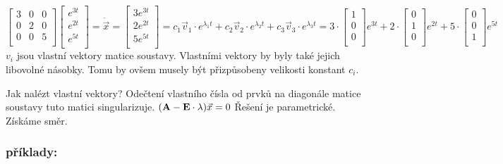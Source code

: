 \[
 \left[
    \begin{array}{ccc}
     3 & 0 & 0\\
     0 & 2 & 0\\
     0 & 0 & 5\\
    \end{array}
  \right]
  \left[
    \begin{array}{c}
     e^{3t}\\
     e^{2t}\\
     e^{5t}\\
    \end{array}
  \right] = 
  \dot{\vec{x}} = 
  \left[
    \begin{array}{c}
     3e^{3t}\\
     2e^{2t}\\
     5e^{5t}\\
    \end{array}
  \right] = 
  c_1\vec{v}_1\cdot e^{\lambda_1 t} + c_2\vec{v}_2\cdot e^{\lambda_2 t} + c_3\vec{v}_3\cdot e^{\lambda_3 t} = 
  3\cdot\left[
    \begin{array}{c}
     1\\
     0\\
     0\\
    \end{array}
  \right] e^{3t} +
  2\cdot\left[
    \begin{array}{c}
     0\\
     1\\
     0\\
    \end{array}
  \right] e^{2t} +
  5\cdot\left[
    \begin{array}{c}
     0\\
     0\\
     1\\
    \end{array}
  \right] e^{5t}
\]
$v_i$ jsou vlastní vektory matice soustavy. Vlastními vektory by byly také jejich libovolné násobky. Tomu by ovšem musely být přizpůsobeny velikosti konstant $c_i$.





Jak nalézt vlastní vektory?\newline
Odečtení vlastního čísla od prvků na diagonále matice soustavy tuto matici singularizuje. $({\bf A} - {\bf E}\cdot \lambda)\vec{x} = 0$ Řešení je parametrické. Získáme směr.

\subsubsection{příklady:}

